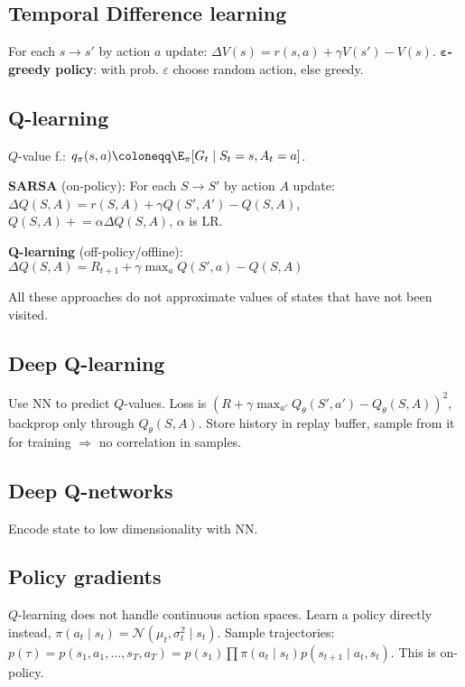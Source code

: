 \subsection{Temporal Difference learning}

For each $s \to s'$ by action $a$ update:
$\Delta V(s) = r(s, a) + \gamma V(s') - V(s)$.
\textbf{$\bm\varepsilon$-greedy policy}: with prob. $\varepsilon$ choose random action, else greedy.

\subsection{Q-learning}

$Q$-value f.: $q_\pi(s, a) \coloneqq \E_\pi[G_t \mid S_t = s, A_t = a]$.

\textbf{SARSA} (on-policy):
For each $S \to S'$ by action $A$ update:
$\Delta Q(S, A) = r(S, A) + \gamma Q(S', A') - Q(S, A)$,
$Q(S, A) {}+{}\!\!\!= \alpha \Delta Q(S, A)$,
$\alpha$ is LR.

\textbf{Q-learning} (off-policy/offline):
$\Delta Q(S, A) = R_{t+1} + \gamma \max_a Q(S', a) - Q(S, A)$

All these approaches do not approximate values of states that have not been visited.

\subsection{Deep Q-learning}

Use NN to predict $Q$-values.
Loss is $(R + \gamma \max_{a'}Q_\theta(S', a') - Q_\theta(S, A))^2$,
backprop only through $Q_\theta(S, A)$.
Store history in replay buffer, sample from it for training $ \Rightarrow $ no correlation in samples.

\subsection{Deep Q-networks}

Encode state to low dimensionality with NN.

\subsection{Policy gradients}

$Q$-learning does not handle continuous action spaces.
Learn a policy directly instead,
$\pi(a_t \mid s_t) = \mathcal{N}(\mu_t, \sigma_t^2 \mid s_t)$.
Sample trajectories: $p(\tau) = p(s_1, a_1, \dots, s_T, a_T) = p(s_1) \prod \pi(a_t \!\!\mid\!\! s_t) p(s_{t+1} \!\!\mid\!\! a_t, s_t)$.
This is on-policy.

